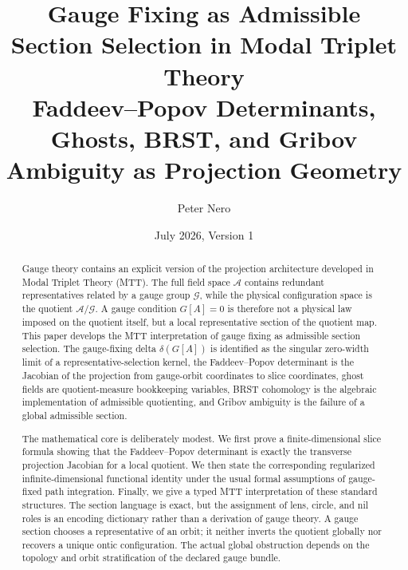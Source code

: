 \documentclass[11pt]{article}
\title{\textbf{Gauge Fixing as Admissible Section Selection in Modal Triplet Theory}\\
\large Faddeev--Popov Determinants, Ghosts, BRST, and Gribov Ambiguity as Projection Geometry}
\author{Peter Nero}
\date{July 2026, Version 1}
\newcommand{\A}{\mathcal A}
\newcommand{\G}{\mathcal G}
\begin{document}
\maketitle

\begin{abstract}
Gauge theory contains an explicit version of the projection architecture developed in Modal Triplet Theory (MTT). The full field space \(\A\) contains redundant representatives related by a gauge group \(\G\), while the physical configuration space is the quotient \(\A/\G\). A gauge condition \(G[A]=0\) is therefore not a physical law imposed on the quotient itself, but a local representative section of the quotient map. This paper develops the MTT interpretation of gauge fixing as admissible section selection. The gauge-fixing delta \(\delta(G[A])\) is identified as the singular zero-width limit of a representative-selection kernel, the Faddeev--Popov determinant is the Jacobian of the projection from gauge-orbit coordinates to slice coordinates, ghost fields are quotient-measure bookkeeping variables, BRST cohomology is the algebraic implementation of admissible quotienting, and Gribov ambiguity is the failure of a global admissible section.

The mathematical core is deliberately modest. We first prove a finite-dimensional slice formula showing that the Faddeev--Popov determinant is exactly the transverse projection Jacobian for a local quotient. We then state the corresponding regularized infinite-dimensional functional identity under the usual formal assumptions of gauge-fixed path integration. Finally, we give a typed MTT interpretation of these standard structures. The section language is exact, but the assignment of lens, circle, and nil roles is an encoding dictionary rather than a derivation of gauge theory. A gauge section chooses a representative of an orbit; it neither inverts the quotient globally nor recovers a unique ontic configuration. The actual global obstruction depends on the topology and orbit stratification of the declared gauge bundle.
\end{abstract}
\end{document}
